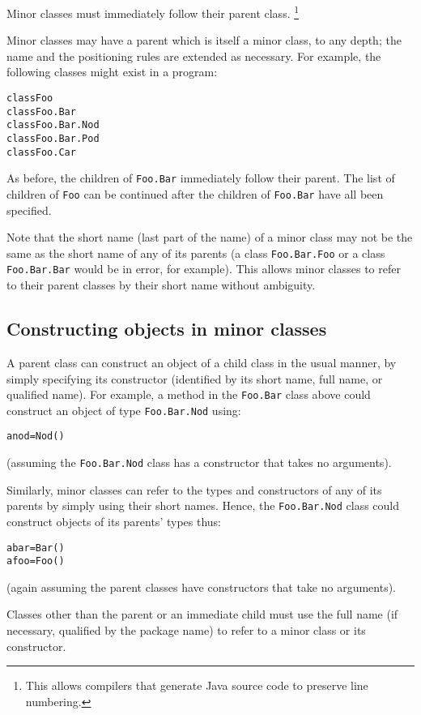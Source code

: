 Minor classes must immediately follow their parent class.
\footnote{
This allows compilers that generate Java source code to preserve line
numbering.
}
 
Minor classes may have a parent which is itself a minor class,
to any depth; the name and the positioning rules are extended as
necessary.  For example, the following classes might exist in a program:
\begin{alltt}
class Foo
  class Foo.Bar
    class Foo.Bar.Nod
    class Foo.Bar.Pod
  class Foo.Car
\end{alltt}
 
As before, the children of \texttt{Foo.Bar} immediately follow their
parent.  The list of children of \texttt{Foo} can be continued after
the children of \texttt{Foo.Bar} have all been specified.
 
Note that the short name (last part of the name) of a minor class may
not be the same as the short name of any of its parents (a
class \texttt{Foo.Bar.Foo} or a class \texttt{Foo.Bar.Bar} would be in
error, for example).  This allows minor classes to refer to their parent
classes by their short name without ambiguity.
\subsection{Constructing objects in minor classes}
 
A parent class can construct an object of a child class in the usual
manner, by simply specifying its constructor (identified by its short
name, full name, or qualified name).
For example, a method in the \texttt{Foo.Bar} class above could construct
an object of type \texttt{Foo.Bar.Nod} using:
\begin{alltt}
anod=Nod()
\end{alltt}
(assuming the \texttt{Foo.Bar.Nod} class has a constructor that takes no
arguments).
 
Similarly, minor classes can refer to the types and constructors of any
of its parents by simply using their short names.
Hence, the \texttt{Foo.Bar.Nod} class could construct objects of its
parents' types thus:
\begin{alltt}
abar=Bar()
afoo=Foo()
\end{alltt}
(again assuming the parent classes have constructors that take no
arguments).
 
Classes other than the parent or an immediate child must use the full
name (if necessary, qualified by the package name) to refer to a minor
class or its constructor.

